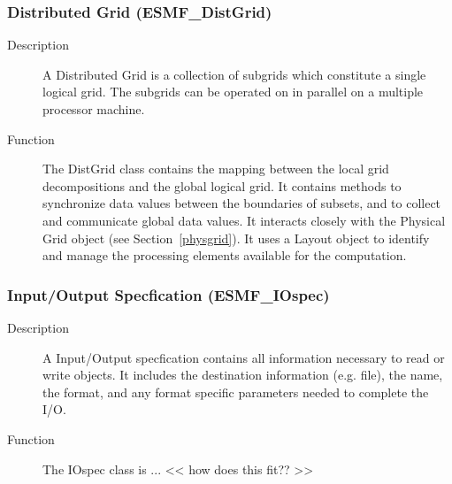 \subsubsection{Distributed Grid (ESMF\_DistGrid)} 
\label{sec:distgrid} 
\begin{description}
\item [Description] A Distributed Grid is a collection of subgrids which
constitute a single logical grid.  The subgrids can be operated on in
parallel on a multiple processor machine.  
\item [Function] The DistGrid class contains the mapping
between the local grid decompositions and the global logical grid. 
It contains methods to 
synchronize data values between the boundaries of subsets, and to
collect and communicate global data values.  It interacts closely with
the Physical Grid object (see Section~\ref{physgrid}).
It uses a Layout object to identify and manage the processing elements 
available for the computation.
\end{description}

\subsubsection{Input/Output Specfication (ESMF\_IOspec)}
\label{sec:iospec} 
\begin{description}
\item [Description] A Input/Output specfication contains all information necessary to
read or write objects.  It includes the destination information (e.g. file), the name,
the format, and any format specific parameters needed to complete the I/O.
\item [Function] The IOspec class is ...   << how does this fit?? >>
\end{description}




